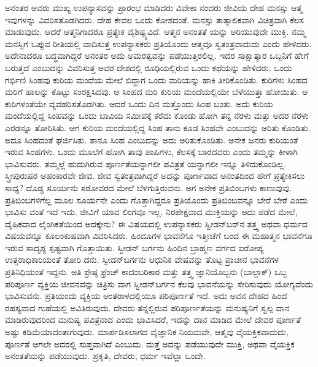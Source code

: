 ಅನಂತರ ಅವರು ಮುಖ್ಯ ಉಪನ್ಯಾಸವನ್ನು ಪ್ರಾರಂಭ ಮಾಡಿದರು ವಿವೇಕಾ ನಂದರು ಜೀವಿಯ ದೇಹ ಮನಸ್ಸು ಆತ್ಮ ಇವುಗಳನ್ನು ವಿವರಿಸತೊಡಗಿದರು. ದೇಹ ಕೇವಲ ಒಂದು ಕೋಶದಂತೆ. ಮನಸ್ಸು ತಾತ್ಕಾಲಿಕವಾಗಿ ವಿಚಿತ್ರವಾಗಿ ಕೆಲಸ ಮಾಡುವುದು. ಆದರೆ ಆತ್ಮನಿಗಾದರೊ ಪ್ರತ್ಯೇಕ ವೈಶಿಷ್ಟ್ಯವಿದೆ. ಆತ್ಮನ ಅನಂತತೆ ಯನ್ನು ಅರಿಯುವುದೇ ಮುಕ್ತಿ. ನಮ್ಮ ಮನಸ್ಸಿಗೆ ಒಪ್ಪುವ ರೀತಿಯಲ್ಲಿ ವಾದಿಸುತ್ತ ಉಪನ್ಯಾಸಕರು ಪ್ರತಿಯೊಂದು ಆತ್ಮವೂ ಸ್ವತಂತ್ರವಾದುದು ಎಂದು ಹೇಳಿದರು. ಅದೇನಾದರೂ ಬದ್ಧವಾಗಿದ್ದರೆ ಅನಂತರ ಅದು ಅಮರತ್ವವನ್ನು ಪಡೆಯುತ್ತಿರಲಿಲ್ಲ. ಇದರ ಸಾಕ್ಷಾತ್ಕಾರ ಒಬ್ಬನಿಗೆ ಹೇಗೆ ಬರುತ್ತದೆ ಎಂಬುದನ್ನು ವಿವರಿಸುತ್ತ ಅವರ ದೇಶದಲ್ಲಿ ರೂಢಿಯಲ್ಲಿರುವ ಒಂದು ಕಥೆಯನ್ನು ಹೇಳಿದರು. ಒಂದು ಗರ್ಭಿಣಿ ಸಿಂಹವು ಕುರಿಯ ಮಂದೆಯ ಮೇಲೆ ಬಿದ್ದಾಗ ಒಂದು ಮರಿಯನ್ನು ಹಾಕಿ ತೀರಿಕೊಂಡಿತು. ಕುರಿಗಳು ಸಿಂಹದ ಮರಿಗೆ ಹಾಲನ್ನು ಕೊಟ್ಟು ಸಂರಕ್ಷಿಸಿದವು. ಆ ಸಿಂಹದ ಮರಿ ಕುರಿಯ ಮಂದೆಯಲ್ಲಿಯೇ ಬೆಳೆಯುತ್ತಾ ಹೋಯಿತು. ಆ ಕುರಿಗಳಂತೆಯೇ ವ್ಯವಹರಿಸತೊಡಗಿತು. ಆದರೆ ಒಂದು ದಿನ ಮತ್ತೊಂದು ಸಿಂಹ ಬಂತು. ಅದು ಕುರಿಯ ಮಂದೆಯಲ್ಲಿದ್ದ ಸಿಂಹವನ್ನು ಒಂದು ಬಾವಿಯ ಸಮೀಪಕ್ಕೆ ಕರೆದು ಕೊಂಡು ಹೋಗಿ ತನ್ನ ನೆರಳು ಮತ್ತು ಅದರ ನೆರಳು ಎರಡನ್ನೂ ತೋರಿಸಿತು. ಆಗ ಕುರಿಯ ಮಂದೆಯಲ್ಲಿದ್ದ ಸಿಂಹ ತಾನು ಕೂಡ ಸಿಂಹವೇ ಎಂಬುದನ್ನು ಅರಿತು ಕೊಂಡಿತು. ಅದೂ ಸಿಂಹದಂತೆ ಘರ್ಜಿಸಿತು. ತಾನೂ ಸಿಂಹ ಎಂಬುದನ್ನು ಅದು ಅರಿತುಕೊಂಡಿತು. ಅನೇಕ ಜನರು ಕುರಿಯಂತೆ ಇರುವ ಸಿಂಹಗಳು. ಒಂದು ಮೂಲೆಗೆ ಹೋಗಿ ತಾವು ಪಾಪಿಗಳು, ಕೆಲಸಕ್ಕೆ ಬಾರದವರು ಎಂದು ತಮ್ಮನ್ನು ಕೀಳಾಗಿ ಭಾವಿಸುವರು. ತಮ್ಮಲ್ಲೆ ಹುದುಗಿರುವ ಪೂರ್ಣತೆಯನ್ನಾಗಲೀ ಪವಿತ್ರತೆ ಯನ್ನಾಗಲೀ ಇನ್ನೂ ತಿಳಿದುಕೊಂಡಿಲ್ಲ. ಸ್ತ್ರೀಪುರುಷರ ಅಹಂಕಾರವೇ ಜೀವ. ಜೀವ ಸ್ವತಂತ್ರವಾಗಿದ್ದರೆ ಅದನ್ನು ಪೂರ್ಣವಾದ ಅನಂತದಿಂದ ಹೇಗೆ ಪ್ರತ್ಯೇಕಿಸಲು ಸಾಧ್ಯ? ದೊಡ್ಡ ಸೂರ್ಯನು ಸರೋವರದ ಮೇಲೆ ಬೆಳಗುತ್ತಿರುವನು. ಅಗ ಅನೇಕ ಪ್ರತಿಬಿಂಬಗಳು ಕಾಣುವುವು. ಪ್ರತಿಬಿಂಬಗಳಿಗೆಲ್ಲ ಮೂಲ ಸೂರ್ಯನೇ ಎಂದು ಗೊತ್ತಾಗಿದ್ದರೂ ಪ್ರತಿಯೊಂದು ಪ್ರತಿಬಿಂಬವನ್ನೂ ಬೇರೆ ಬೇರೆ ಎಂದು ಭಾವಿಸು ವಂತೆ ಇದೆ ಇದು. ಜೀವಿಗೆ ಯಾವ ಲಿಂಗವೂ ಇಲ್ಲ. ನಿರಪೇಕ್ಷವಾದ ಮುಕ್ತಿಯನ್ನು ಅದು ಪಡೆದ ಮೇಲೆ, ದೈಹಿಕವಾದ ಲೈಂಗಿಕತೆಯಿಂದ ಅದಕ್ಕೇನು? ಈ ವಿಷಯದಲ್ಲಿ ಉಪನ್ಯಾಸಕರು ಸ್ವೀಡನ್​ಬರ್​ನ ತತ್ತ್ವ ಅಥವಾ ಧರ್ಮದ ವಿಷಯವನ್ನೂ ಕೂಲಂಕುಷವಾಗಿ ವಿವರಿಸಿದರು. ಹಿಂದೂಗಳ ಭಾವನೆಗೂ ಇತ್ತೀಚೆಗೆ ಬಂದ ಈ ಮಹಾತ್ಮನ ಭಾವನೆಗೂ ಇರುವ ಸಾದೃಶ್ಯ ಸ್ಪಷ್ಟವಾಗಿ ಗೊತ್ತಾಯಿತು. ಸ್ವೀಡನ್​ ಬರ್ಗನು ಹಿಂದಿನ ಬ್ರಾಹ್ಮಣ ವರ್ಗದ ಐರೋಪ್ಯ ಉತ್ತರಾಧಿಕಾರಿಯಂತೆ ತೋರಿ ದನು. ಸ್ವೀಡನ್​ಬರ್ಗನು ಆಧುನಿಕ ವೇಷವನ್ನು ತೊಟ್ಟ ಪ್ರಾಚೀನ ಭಾವನೆಗಳ ಪ್ರತಿನಿಧಿಯಂತೆ ಇದ್ದನು. ಅತಿ ಶ್ರೇಷ್ಠ ಫ್ರೆಂಚ್​ ಕಾದಂಬರಿಕಾರ ಮತ್ತು ತತ್ತ್ವ ಜ್ಞಾನಿಯೊಬ್ಬನು (ಬಾಲ್ಜಾಕ್​) ಒಬ್ಬ ಪರಿಪೂರ್ಣ ವ್ಯಕ್ತಿಯ ಜೀವನವನ್ನು ಚಿತ್ರಿಸು ವಾಗ ಸ್ವೀಡನ್​ಬರ್ಗನ ಕೆಲವು ಭಾವನೆಯನ್ನು ಸೇರಿಸುವುದು ಯೋಗ್ಯವೆಂದು ಭಾವಿಸುವನು. ಪ್ರತಿಯಂದು ವ್ಯಕ್ತಿಯ ಅಂತರಾಳದಲ್ಲಿಯೂ ಪರಿಪೂರ್ಣತೆ ಇದೆ. ಅದು ಅವನ ದೇಹದ ಹಿಂದೆ ರಹಸ್ಯವಾದ ಗುಹೆಯಲ್ಲಿ ಅವಿತಿರುವುದು. ದೇವರು ತನ್ನಲ್ಲಿರುವ ಪರಿಪೂರ್ಣತೆಯನ್ನು ಮನುಷ್ಯನಿಗೆ ಸ್ವಲ್ಪ ದಾನ ಮಾಡಿರುವುದರಿಂದ ಮನುಷ್ಯ ಪವಿತ್ರನಾದ ಎಂದು ಭಾವಿಸಿದರೆ, ಇದನ್ನು ದಾನ ಮಾಡಿದ ಮೇಲೆ ದೇವರ ಪೂರ್ಣತೆ ಅಷ್ಟು ಕಡಿಮೆಯಾದಂತಾಗುವುದು. ಮಾರ್ಪಡಿಸಲಾಗದ ವೈಜ್ಞಾನಿಕ ನಿಯಮವೇ, ಆತ್ಮವು ವೈಯಕ್ತಿಕವಾದುದು, ಪೂರ್ಣತೆ ಆಗಲೇ ಅದರಲ್ಲಿ ಸುಪ್ತವಾಗಿದೆ ಎಂಬುದು. ಮತ್ತೆ ಅದನ್ನು ಪಡೆಯುವುದೇ ಮುಕ್ತಿ, ಅಥವಾ ವೈಯಕ್ತಿಕ ಅನಂತತೆಯನ್ನು ಪಡೆಯುವುದು. ಪ್ರಕೃತಿ, ದೇವರು, ಧರ್ಮ ಇವೆಲ್ಲಾ ಒಂದೇ.

